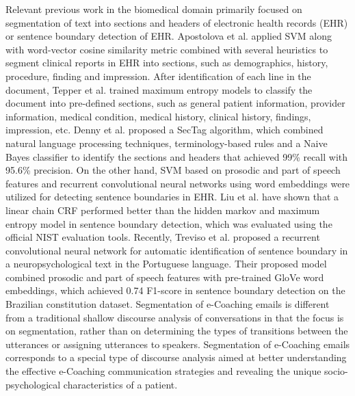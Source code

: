 \documentclass{amia}
\begin{document}
Relevant previous work in the biomedical domain primarily focused on segmentation of text into sections and headers of electronic health records (EHR)\cite{apostolova2009automatic,denny2009evaluation,tepper2012statistical,cho2002text} or sentence boundary detection of EHR.\cite{griffis2016quantitative,kreuzthaler2015detection,treviso2017sentence} Apostolova et al. applied SVM along with word-vector cosine similarity metric combined with several heuristics to segment clinical reports in EHR into sections, such as demographics, history, procedure, finding and impression.\cite{apostolova2009automatic} After identification of each line in the document, Tepper et al. trained maximum entropy models to classify the document into pre-defined sections, such as general patient information, provider information, medical condition, medical history, clinical history, findings, impression, etc.\cite{tepper2012statistical} Denny et al. proposed a SecTag algorithm, which combined natural language processing techniques, terminology-based rules and a Naive Bayes classifier to identify the sections and headers that achieved 99\% recall with 95.6\% precision. \cite{denny2009evaluation} On the other hand, SVM based on prosodic and part of speech features \cite{kreuzthaler2015detection} and recurrent convolutional neural networks using word embeddings \cite{griffis2016quantitative} were utilized for detecting sentence boundaries in EHR. Liu et al. have shown that a linear chain CRF performed better than the hidden markov and maximum entropy model in sentence boundary detection, which was evaluated using the official NIST evaluation tools.\cite{liu2005using} Recently, Treviso et al. proposed a recurrent convolutional neural network for automatic identification of sentence boundary in a neuropsychological text in the Portuguese language.\cite{treviso2017sentence} Their proposed model combined prosodic and part of speech features with pre-trained GloVe word embeddings,\cite{pennington2014glove} which achieved 0.74 F1-score in sentence boundary detection on the Brazilian constitution dataset. Segmentation of e-Coaching emails is different from a traditional shallow discourse analysis of conversations \cite{galley2003discourse} in that the focus is on segmentation, rather than on determining the types of transitions between the utterances or assigning utterances to speakers. Segmentation of e-Coaching emails corresponds to a special type of discourse analysis \cite{webber2012discourse} aimed at better understanding the effective e-Coaching communication strategies and revealing the unique socio-psychological characteristics of a patient.
\end{document}

